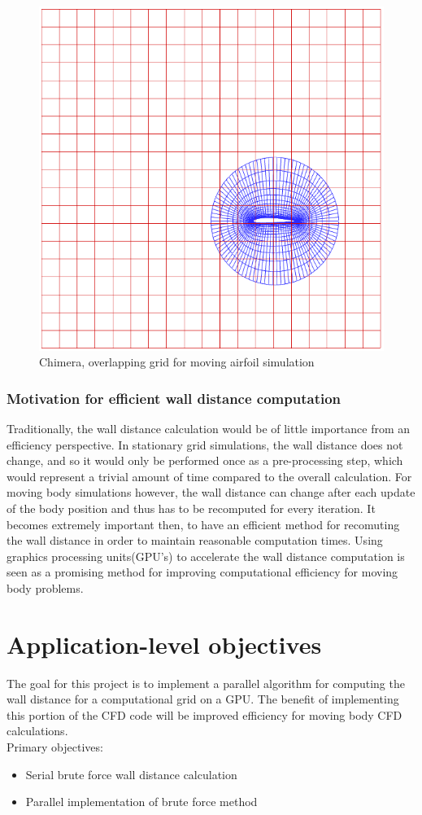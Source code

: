 \documentclass[]{aiaa-tc}%
\begin{document}
\begin{figure}
  \centering
  \includegraphics[width=0.3\linewidth]{figures/chimera_grid}
  \caption{Chimera, overlapping grid for moving airfoil simulation}
  \label{f:chimera_grid}
\end{figure}


\subsubsection{Motivation for efficient wall distance computation}
Traditionally, the wall distance calculation would be of little
importance from an efficiency perspective. In stationary grid
simulations, the wall distance does not change, and so it would only
be performed once as a pre-processing step, which would represent a
trivial amount of time compared to the overall calculation. For moving
body simulations however, the wall distance can change after each
update of the body position and thus has to be recomputed for every
iteration. It becomes extremely important then, to have an efficient
method for recomuting the wall distance in order to maintain
reasonable computation times. Using graphics processing units(GPU's)
to accelerate the wall distance computation is seen as a promising
method for improving computational efficiency for moving body
problems.

\section{Application-level objectives}
The goal for this project is to implement a parallel algorithm for
computing the wall distance for a computational grid on a GPU. The
benefit of implementing this portion of the CFD code will be improved
efficiency for moving body CFD calculations.\\

Primary objectives:
\begin{itemize}
  \item Serial brute force wall distance calculation
  \item Parallel implementation of brute force method
\end{itemize}
\end{document}
